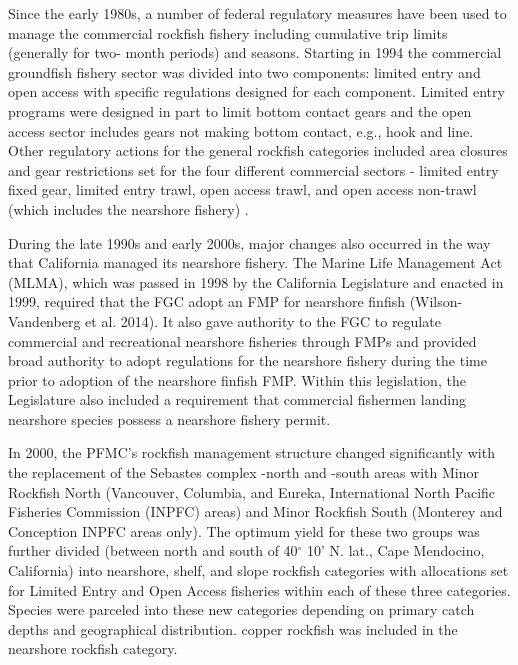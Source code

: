 \documentclass[11pt,
  english,
  letterpaper,
]{article}
\begin{document}
Since the early 1980s, a number of federal regulatory measures have been used to manage the commercial rockfish fishery including cumulative trip limits (generally for two- month periods) and seasons. Starting in 1994 the commercial groundfish fishery sector was divided into two components: limited entry and open access with specific regulations designed for each component. Limited entry programs were designed in part to limit bottom contact gears and the open access sector includes gears not making bottom contact, e.g., hook and line. Other regulatory actions for the general rockfish categories included area closures and gear restrictions set for the four different commercial sectors - limited entry fixed gear, limited entry trawl, open access trawl, and open access non-trawl (which includes the nearshore fishery) .

During the late 1990s and early 2000s, major changes also occurred in the way that California managed its nearshore fishery. The Marine Life Management Act (MLMA), which was passed in 1998 by the California Legislature and enacted in 1999, required that the FGC adopt an FMP for nearshore finfish (Wilson-Vandenberg et al. 2014). It also gave authority to the FGC to regulate commercial and recreational nearshore fisheries through FMPs and provided broad authority to adopt regulations for the nearshore fishery during the time prior to adoption of the nearshore finfish FMP. Within this legislation, the Legislature also included a requirement that commercial fishermen landing nearshore species possess a nearshore fishery permit.

In 2000, the PFMC's rockfish management structure changed significantly with the replacement of the Sebastes complex -north and -south areas with Minor Rockfish North (Vancouver, Columbia, and Eureka, International North Pacific Fisheries Commission (INPFC) areas) and Minor Rockfish South (Monterey and Conception INPFC areas only). The optimum yield for these two groups was further divided (between north and south of 40\(^\circ\) 10' N. lat., Cape Mendocino, California) into nearshore, shelf, and slope rockfish categories with allocations set for Limited Entry and Open Access fisheries within each of these three categories. Species were parceled into these new categories depending on primary catch depths and geographical distribution. copper rockfish was included in the nearshore rockfish category.
\end{document}
